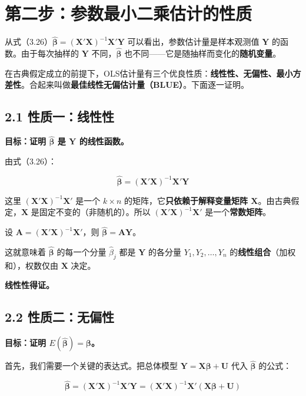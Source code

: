 \documentclass[12pt,a4paper]{ctexart}
\begin{document}
\section{第二步：参数最小二乘估计的性质}

从式（3.26）$\hat{\boldsymbol{\beta}} = (\mathbf{X}'\mathbf{X})^{-1}\mathbf{X}'\mathbf{Y}$ 可以看出，参数估计量是样本观测值 $\mathbf{Y}$ 的函数。由于每次抽样的 $\mathbf{Y}$ 不同，$\hat{\boldsymbol{\beta}}$ 也不同——它是随抽样而变化的\textbf{随机变量}。

在古典假定成立的前提下，OLS估计量有三个优良性质：\textbf{线性性、无偏性、最小方差性}。合起来叫做\textbf{最佳线性无偏估计量（BLUE）}。下面逐一证明。

\subsection{2.1 性质一：线性性}

\textbf{目标：证明 $\hat{\boldsymbol{\beta}}$ 是 $\mathbf{Y}$ 的线性函数。}

由式（3.26）：

\[
\hat{\boldsymbol{\beta}} = (\mathbf{X}'\mathbf{X})^{-1}\mathbf{X}'\mathbf{Y}
\]

这里 $(\mathbf{X}'\mathbf{X})^{-1}\mathbf{X}'$ 是一个 $k \times n$ 的矩阵，它\textbf{只依赖于解释变量矩阵 $\mathbf{X}$}。由古典假定，$\mathbf{X}$ 是固定不变的（非随机的）。所以 $(\mathbf{X}'\mathbf{X})^{-1}\mathbf{X}'$ 是一个\textbf{常数矩阵}。

设 $\mathbf{A} = (\mathbf{X}'\mathbf{X})^{-1}\mathbf{X}'$，则 $\hat{\boldsymbol{\beta}} = \mathbf{A}\mathbf{Y}$。

这就意味着 $\hat{\boldsymbol{\beta}}$ 的每一个分量 $\hat{\beta}_j$ 都是 $\mathbf{Y}$ 的各分量 $Y_1, Y_2, \ldots, Y_n$ 的\textbf{线性组合}（加权和），权数仅由 $\mathbf{X}$ 决定。

\textbf{线性性得证。}

\subsection{2.2 性质二：无偏性}

\textbf{目标：证明 $E(\hat{\boldsymbol{\beta}}) = \boldsymbol{\beta}$。}

首先，我们需要一个关键的表达式。把总体模型 $\mathbf{Y} = \mathbf{X}\boldsymbol{\beta} + \mathbf{U}$ 代入 $\hat{\boldsymbol{\beta}}$ 的公式：

\[
\hat{\boldsymbol{\beta}} = (\mathbf{X}'\mathbf{X})^{-1}\mathbf{X}'\mathbf{Y} = (\mathbf{X}'\mathbf{X})^{-1}\mathbf{X}'(\mathbf{X}\boldsymbol{\beta} + \mathbf{U})
\]
\end{document}
